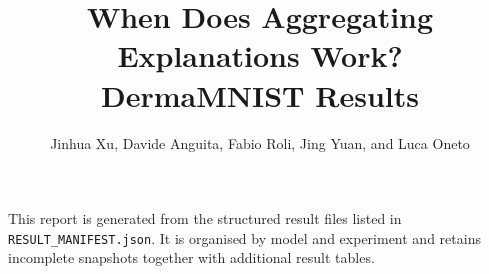 \documentclass[10pt,a4paper]{article}
\title{When Does Aggregating Explanations Work?\\\large DermaMNIST Results}
\author{Jinhua Xu, Davide Anguita, Fabio Roli, Jing Yuan, and Luca Oneto}
\date{}
\begin{document}
\maketitle

\noindent
This report is generated from the structured result files listed in
\texttt{RESULT\_MANIFEST.json}. It is organised by model and experiment
and retains incomplete snapshots together with additional result tables.


\end{document}
